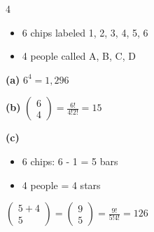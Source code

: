 \documentclass[12 pt]{article}
\begin{document}
    \begin{exercise}{4}
    \hfill

    \begin{itemize}
        \item 6 chips labeled 1, 2, 3, 4, 5, 6
        \item 4 people called A, B, C, D
    \end{itemize}

    \textbf{(a)} $6^4 = 1,296$

    \textbf{(b)} $\begin{pmatrix}
        6 \\
        4
    \end{pmatrix} = \frac{6!}{4!2!} = 15$

    \textbf{(c)}
    \begin{itemize}
        \item 6 chips: 6 - 1 = 5 bars
        \item 4 people = 4 stars
    \end{itemize}

    $\begin{pmatrix}
        5 + 4 \\
        5
    \end{pmatrix} = \begin{pmatrix}
        9 \\
        5
    \end{pmatrix} = \frac{9!}{5!4!} = 126$        
    \end{exercise}
\end{document}
